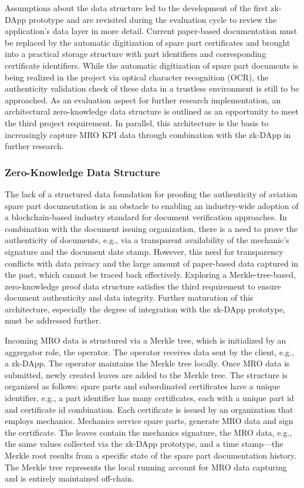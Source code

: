 Assumptions about the data structure led to the development of the first zk-DApp prototype and are revisited during the evaluation cycle to review the application's data layer in more detail. Current paper-based documentation must be replaced by the automatic digitization of spare part certificates and brought into a practical storage structure with part identifiers and corresponding certificate identifiers. While the automatic digitization of spare part documents is being realized in the project via optical character recognition (OCR), the authenticity validation check of these data in a trustless environment is still to be approached. As an evaluation aspect for further research implementation, an architectural zero-knowledge data structure is outlined as an opportunity to meet the third project requirement. In parallel, this architecture is the basis to increasingly capture MRO KPI data through combination with the zk-DApp in further research. 

\subsubsection{Zero-Knowledge Data Structure}
The lack of a structured data foundation for proofing the authenticity of aviation spare part documentation is an obstacle to enabling an industry-wide adoption of a blockchain-based industry standard for document verification approaches. In combination with the document issuing organization, there is a need to prove the authenticity of documents, e.g., via a transparent availability of the mechanic's signature and the document date stamp. However, this need for transparency conflicts with data privacy and the large amount of paper-based data captured in the past, which cannot be traced back effectively. Exploring a Merkle-tree-based, zero-knowledge proof data structure satisfies the third requirement to ensure document authenticity and data integrity. Further maturation of this architecture, especially the degree of integration with the zk-DApp prototype, must be addressed further.

Incoming MRO data is structured via a Merkle tree, which is initialized by an aggregator role, the operator. The operator receives data sent by the client, e.g., a zk-DApp. The operator maintains the Merkle tree locally. Once MRO data is submitted, newly created leaves are added to the Merkle tree. The structure is organized as follows: spare parts and subordinated certificates have a unique identifier, e.g., a part identifier has many certificates, each with a unique part id and certificate id combination. Each certificate is issued by an organization that employs mechanics. Mechanics service spare parts, generate MRO data and sign the certificate. The leaves contain the mechanics signature, the MRO data, e.g., the same values collected via the zk-DApp prototype, and a time stamp—the Merkle root results from a specific state of the spare part documentation history. The Merkle tree represents the local running account for MRO data capturing and is entirely maintained off-chain. 

